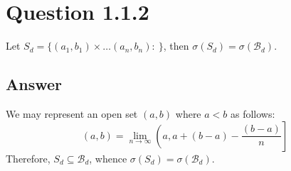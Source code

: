 \documentclass[
	12pt, %
]{fphw}
\begin{document}
\section*{Question 1.1.2}
\begin{problem}
	Let $S_d=\{(a_1,b_1)\times \dots (a_n,b_n): \ \}$, then $\sigma(S_d)=\sigma(\mathcal{B}_d)$.
	
\end{problem}
\subsection*{Answer}
We may represent an open set $(a,b)$ where $a<b$ as follows: 
$$(a,b)=\lim\limits_{n \to \infty} \left (a, a+(b-a)-\frac{(b-a)}{n}\right]$$
Therefore, $S_d \subseteq \mathcal{B}_d$, whence $\sigma(S_d)=\sigma(\mathcal{B}_d)$.
\end{document}
